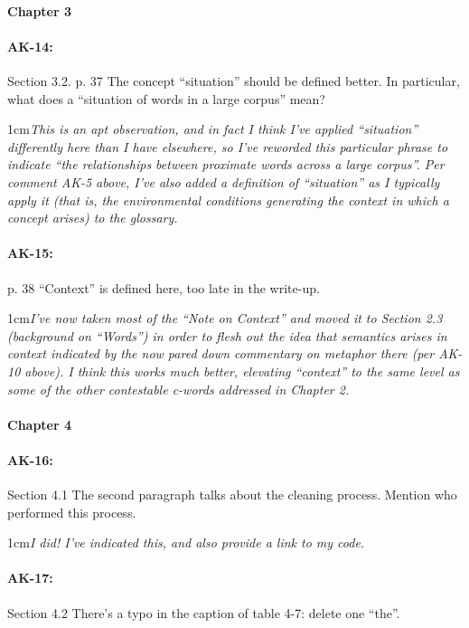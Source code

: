 \documentclass[11pt,a4paper]{article}
\newcommand{\res}[1]{\vspace{0.25cm} \begin{adjustwidth}{1cm}{}\emph{#1}\end{adjustwidth}}
\begin{document}
\paragraph{Chapter 3}

\paragraph{AK-14:} Section 3.2. p. 37 The concept “situation” should be defined better. In particular, what does a “situation of words in a large corpus” mean?

\res{This is an apt observation, and in fact I think I've applied ``situation'' differently here than I have elsewhere, so I've reworded this particular phrase to indicate ``the relationships between proximate words across a large corpus''.  Per comment AK-5 above, I've also added a definition of ``situation'' as I typically apply it (that is, the environmental conditions generating the context in which a concept arises) to the glossary.}

\paragraph{AK-15:} p. 38 “Context” is defined here, too late in the write-up.

\res{I've now taken most of the ``Note on Context'' and moved it to Section 2.3 (background on ``Words'') in order to flesh out the idea that semantics arises in context indicated by the now pared down commentary on metaphor there (per AK-10 above).  I think this works much better, elevating ``context'' to the same level as some of the other contestable c-words addressed in Chapter 2.}

\paragraph{Chapter 4}

\paragraph{AK-16:} Section 4.1 The second paragraph talks about the cleaning process. Mention who performed this process.

\res{I did!  I've indicated this, and also provide a link to my code.}

\paragraph{AK-17:} Section 4.2 There’s a typo in the caption of table 4-7: delete one ``the''.
\end{document}
